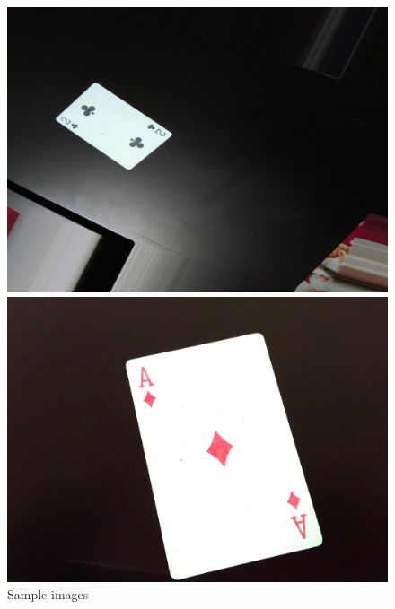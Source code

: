 \documentclass{article}
\begin{document}
\begin{figure}[htbp]
    \centering
    \begin{minipage}{0.45\textwidth}
        \centering
        \includegraphics[width=\linewidth]{./assets/2C40.jpg}
    \end{minipage}
    \hfill
    \begin{minipage}{0.45\textwidth}
        \centering
        \includegraphics[width=\linewidth]{./assets/AD48.jpg}
    \end{minipage}
	\caption{Sample images}
    \label{fig:fig1}
\end{figure}
\end{document}

